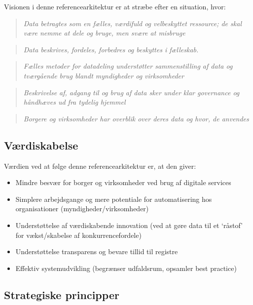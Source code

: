 Visionen i denne referencearkitektur er at stræbe efter en situation,
hvor:

\begin{quote}
\emph{Data betragtes som en fælles, værdifuld og velbeskyttet ressource;
de skal være nemme at dele og bruge, men svære at misbruge}
\end{quote}

\begin{quote}
\emph{Data beskrives, fordeles, forbedres og beskyttes i fælleskab.}
\end{quote}

\begin{quote}
\emph{Fælles metoder for datadeling understøtter sammenstilling af data
og tværgående brug blandt myndigheder og virksomheder}
\end{quote}

\begin{quote}
\emph{Beskrivelse af, adgang til og brug af data sker under klar
governance og håndhæves ud fra tydelig hjemmel}
\end{quote}

\begin{quote}
\emph{Borgere og virksomheder har overblik over deres data og hvor, de
anvendes}
\end{quote}

\subsection{Værdiskabelse}\label{vuxe6rdiskabelse}

Værdien ved at følge denne referencearkitektur er, at den giver:

\begin{itemize}
\tightlist
\item
  Mindre besvær for borger og virksomheder ved brug af digitale services
\item
  Simplere arbejdsgange og mere potentiale for automatisering hos
  organisationer (myndigheder/virksomheder)
\item
  Understøttelse af værdiskabende innovation (ved at gøre data til et
  `råstof' for vækst/skabelse af konkurrencefordele)
\item
  Understøttelse transparens og bevare tillid til registre
\item
  Effektiv systemudvikling (begrænser udfaldsrum, opsamler best
  practice)
\end{itemize}

\subsection{Strategiske principper}\label{strategiske-principper}

